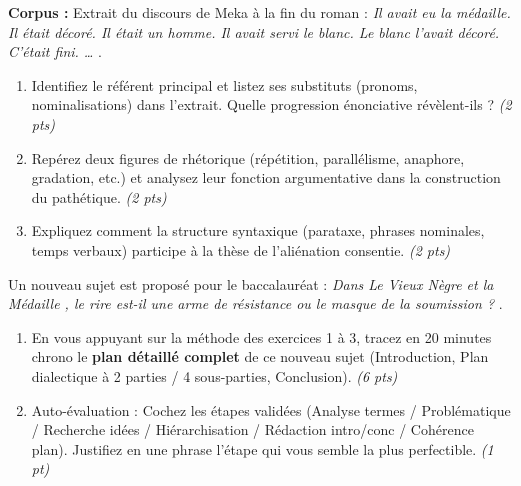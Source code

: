 \documentclass[11pt]{article}
\begin{document}
\begin{exercice}
\textbf{Corpus :} Extrait du discours de Meka à la fin du roman : \og \textit{Il avait eu la médaille. Il était décoré. Il était un homme. Il avait servi le blanc. Le blanc l'avait décoré. C'était fini. \dots} \fg{}.
\begin{enumerate}
    \item Identifiez le référent principal et listez ses substituts (pronoms, nominalisations) dans l'extrait. Quelle progression énonciative révèlent-ils ? \textit{(2 pts)}
    \item Repérez deux figures de rhétorique (répétition, parallélisme, anaphore, gradation, etc.) et analysez leur fonction argumentative dans la construction du pathétique. \textit{(2 pts)}
    \item Expliquez comment la structure syntaxique (parataxe, phrases nominales, temps verbaux) participe à la thèse de l'aliénation consentie. \textit{(2 pts)}
\end{enumerate}
\end{exercice}

\begin{exercice}
Un nouveau sujet est proposé pour le baccalauréat : \og \textit{Dans \og Le Vieux Nègre et la Médaille \fg{}, le rire est-il une arme de résistance ou le masque de la soumission ?} \fg{}.
\begin{enumerate}
    \item En vous appuyant sur la méthode des exercices 1 à 3, tracez en 20 minutes chrono le \textbf{plan détaillé complet} de ce nouveau sujet (Introduction, Plan dialectique à 2 parties / 4 sous-parties, Conclusion). \textit{(6 pts)}
    \item Auto-évaluation : Cochez les étapes validées (Analyse termes / Problématique / Recherche idées / Hiérarchisation / Rédaction intro/conc / Cohérence plan). Justifiez en une phrase l'étape qui vous semble la plus perfectible. \textit{(1 pt)}
\end{enumerate}
\end{exercice}
\end{document}
